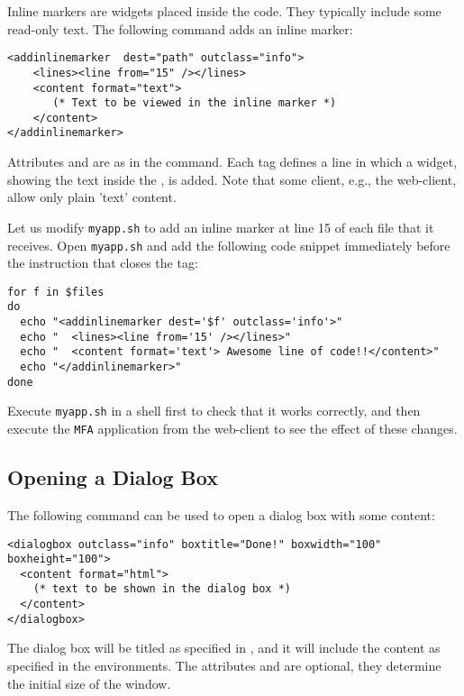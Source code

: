 Inline markers are widgets placed inside the code. They typically
include some read-only text. The following command adds an inline
marker:

\medskip
\begin{lstlisting}
<addinlinemarker  dest="path" outclass="info"> 
    <lines><line from="15" /></lines>
    <content format="text">
       (* Text to be viewed in the inline marker *)
    </content>
</addinlinemarker>
\end{lstlisting}

\medskip
\noindent
Attributes  and  are as in the 
command. Each  tag defines a line in which a widget, showing
the text inside the , is added. Note that some client,
e.g., the web-client, allow only plain 'text' content.

Let us modify \texttt{myapp.sh} to add an inline marker at line 15 of
each file that it receives. Open \texttt{myapp.sh} and add the
following code snippet immediately before the instruction that closes
the  tag:

\medskip
\begin{lstlisting}[style=script]for f in $files 
do
  echo "<addinlinemarker dest='$f' outclass='info'>"
  echo "  <lines><line from='15' /></lines>"
  echo "  <content format='text'> Awesome line of code!!</content>"
  echo "</addinlinemarker>"
done
\end{lstlisting}

\medskip
\noindent
Execute \texttt{myapp.sh} in a shell first to check that it works
correctly, and then execute the \texttt{MFA} application from the
web-client to see the effect of these changes.


\subsection{Opening a Dialog Box}

The following command can be used to open a dialog box with some
content:

\medskip
\begin{lstlisting}
<dialogbox outclass="info" boxtitle="Done!" boxwidth="100" boxheight="100"> 
  <content format="html">
    (* text to be shown in the dialog box *)
  </content>
</dialogbox>
\end{lstlisting}

\medskip 
\noindent 
The dialog box will be titled as specified in , and it
will include the content as specified in the 
environments. The attributes  and  are
optional, they determine the initial size of the window.

